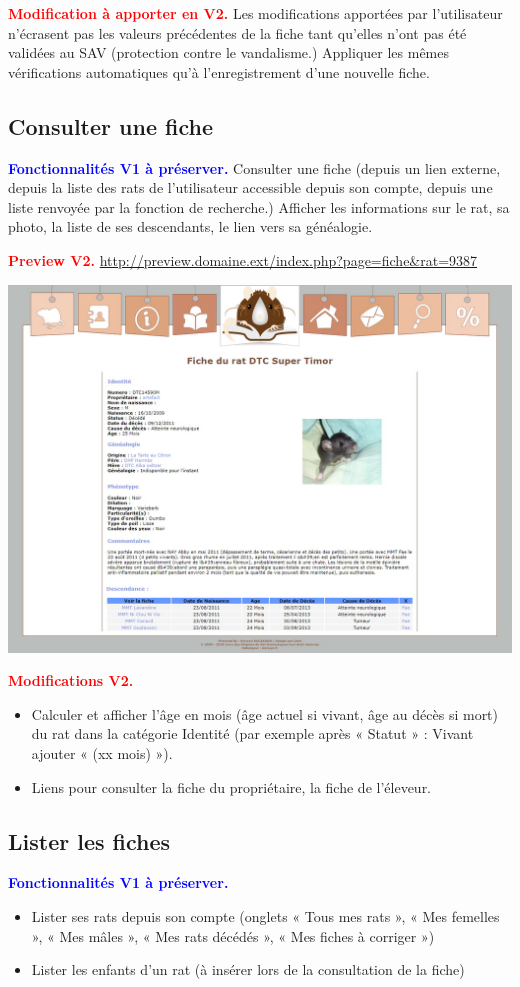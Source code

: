 \documentclass[a4paper,10pt]{article}
\newcommand\existant[1]{\noindent\textbf{\textcolor{blue}{#1}}}
\newcommand\desire[1]{\noindent\textbf{\textcolor{red}{#1}}}
\begin{document}
\desire{Modification à apporter en V2.} Les modifications apportées par l'utilisateur n'écrasent pas les valeurs précédentes de la fiche tant qu'elles n'ont pas été validées au SAV (protection contre le vandalisme.) Appliquer les mêmes vérifications automatiques qu'à l'enregistrement d'une nouvelle fiche.

\subsection{Consulter une fiche}
\existant{Fonctionnalités V1 à préserver.}
Consulter une fiche (depuis un lien externe, depuis la liste des rats de l'utilisateur accessible depuis son compte, depuis une liste renvoyée par la fonction de recherche.) Afficher les informations sur le rat, sa photo, la liste de ses descendants, le lien vers sa généalogie.

\desire{Preview V2.} \url{http://preview.domaine.ext/index.php?page=fiche&rat=9387}

\begin{center}\includegraphics[width=0.8\linewidth]{FicheRat.jpg}\end{center}

\desire{Modifications V2.}
\begin{itemize}
\item Calculer et afficher l'âge en mois (âge actuel si vivant, âge au décès si mort) du rat dans la catégorie Identité (par exemple après « Statut » : Vivant ajouter « (xx mois) »).  
\item Liens pour consulter la fiche du propriétaire, la fiche de l'éleveur.
\end{itemize}

\subsection{Lister les fiches}
\existant{Fonctionnalités V1 à préserver.}
\begin{itemize}
\item Lister ses rats depuis son compte (onglets « Tous mes rats », « Mes femelles », « Mes mâles », « Mes rats décédés », « Mes fiches à corriger »)   
\item Lister les enfants d'un rat (à insérer lors de la consultation de la fiche) 
\end{itemize}
\end{document}
